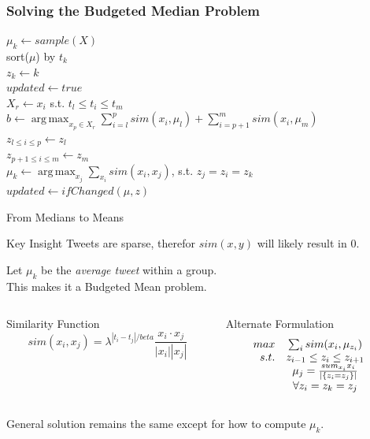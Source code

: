\documentclass[compress]{beamer}
\DeclareMathOperator*{\argmax}{arg\,max}
\begin{document}
\begin{frame}[fragile]
\frametitle{Solving the Budgeted Median Problem}
\small{
\begin{algorithm}[H]
$\mu_k \leftarrow sample(X)$ \\
sort($\mu$) by $t_k$ \\
$z_k \leftarrow k$ \\
$updated \leftarrow true$ \\
 {
     {
        $X_r \leftarrow x_i$ s.t. $t_l \leq t_i \leq t_m$ \\
        $b \leftarrow \argmax_{x_p \in X_r} \sum_{i=l}^p sim(x_i, \mu_l) +
                                                   \sum_{i=p+1}^m sim(x_i, \mu_m)$ \\
        $z_{l \leq i \leq p} \leftarrow z_l$ \\
        $z_{p+1 \leq i \leq m} \leftarrow z_m$ \\
    }
    $\mu_k \leftarrow \argmax_{x_j} \sum_{x_i} sim(x_i, x_j)$, s.t. $z_j = z_i = z_k$ \\
    $updated \leftarrow ifChanged(\mu, z)$
}
\end{algorithm}
}
\end{frame}

\begin{frame}{From Medians to Means}

\begin{block}{Key Insight}
Tweets are sparse, therefor $sim(x,y)$ will likely result in $0$.
\end{block}

\pause

Let $\mu_k$ be the \textit{average tweet} within a group.  \\
This makes it a Budgeted Mean problem.

\begin{columns}[t]
\begin{column}[1]{3.5cm}
Similarity Function
\[
sim(x_i, x_j) = \lambda^{|t_i - t_j|/beta} \frac{x_i \cdot x_j}{|x_i||x_j|}
\]
\end{column}
\begin{column}[2]{5cm}
Alternate Formulation
\[
\begin{array}{r c l }
max & \sum_i sim(x_i, \mu_{z_i}) & \\
s.t. & z_{i-1} \leq z_i \leq z_{i+1} & \\
& \mu_j = \frac{sum_{x_i} x_i}{|\{z_i = z_j\}|} & \\
& \forall z_i = z_k = z_j & \\
\end{array}
\]

\end{column}
\end{columns}
General solution remains the same except for how to compute $\mu_k$.
\end{frame}
\end{document}
